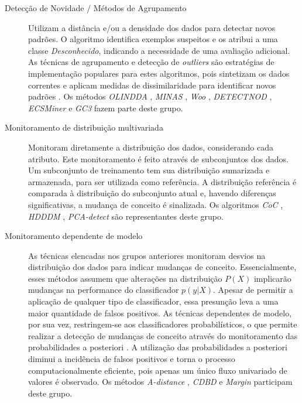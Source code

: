 \documentclass[qual, classic, a4paper]{ufbathesis}
\begin{document}
\begin{description}
    \item[Detecção de Novidade / Métodos de Agrupamento] 
    Utilizam a distância e/ou a densidade dos dados para detectar novos padrões.
    O algoritmo identifica exemplos suspeitos e os atribui a uma classe \textit{Desconhecido}, indicando a necessidade de uma avaliação adicional.
    As técnicas de agrupamento e detecção de \textit{outliers} são estratégias de implementação populares para estes algoritmos, 
    pois sintetizam os dados correntes e aplicam medidas de dissimilaridade para identificar novos padrões \cite{Ryu:Kantardzic:2012}.
    Os métodos 
    \textit{OLINDDA} \cite{Spinosa:2007:OCA:1244002.1244107},
    \textit{MINAS} \cite{Faria:2013:NDA:2480362.2480515},
    \textit{Woo} \cite{Ryu:Kantardzic:2012},
    \textit{DETECTNOD} \cite{Hashemi:Hayat:DETECTNOD:2010},
    \textit{ECSMiner} \cite{Masud:2011:CNC:1978259.1978529} e
    \textit{GC3} \cite{Sethi2016b:GC3} fazem parte deste grupo.
    
    \item[Monitoramento de distribuição multivariada]
    Monitoram diretamente a distribuição dos dados, considerando cada atributo.
    Este monitoramento é feito através de subconjuntos dos dados.
    Um subconjunto de treinamento tem sua distribuição sumarizada e armazenada, para ser utilizada como referência.
    A distribuição referência é comparada à distribuição do subconjunto atual e, havendo diferenças significativas, a mudança de conceito é sinalizada.
    Os algoritmos
    \textit{CoC} \cite{Lee:Magoules:CoC:2012},
    \textit{HDDDM} \cite{Ditzler:Polikar:HDDDM:2011},
    \textit{PCA-detect} \cite{Kuncheva:PCADetect:20085}
    são representantes deste grupo.

    \item[Monitoramento dependente de modelo]
    As técnicas elencadas nos grupos anteriores monitoram desvios na distribuição dos dados para indicar mudanças de conceito.
    Essencialmente, esses métodos assumem que alterações na distribuição $P(X)$ implicarão mudanças na performance do classificador $p(y|X)$.
    Apesar de permitir a aplicação de qualquer tipo de classificador, essa presunção leva a uma maior quantidade de falsos positivos.
    As técnicas dependentes de modelo, por sua vez, restringem-se aos classificadores probabilísticos,
    o que permite realizar a detecção de mudanças de conceito através do monitoramento das probabilidades a posteriori \cite{Zliobaite:2010}.
    A utilização das probabilidades a posteriori diminui a incidência de falsos positivos e torna o processo computacionalmente eficiente, 
    pois apenas um único fluxo univariado de valores é observado.
    Os métodos 
    \textit{A-distance} \cite{Dredze:ADistance:2010585},
    \textit{CDBD} \cite{Lindstrom:CDBD:2013} e
    \textit{Margin} \cite{Dries:Margin:2009} participam deste grupo.
\end{description}
\end{document}
